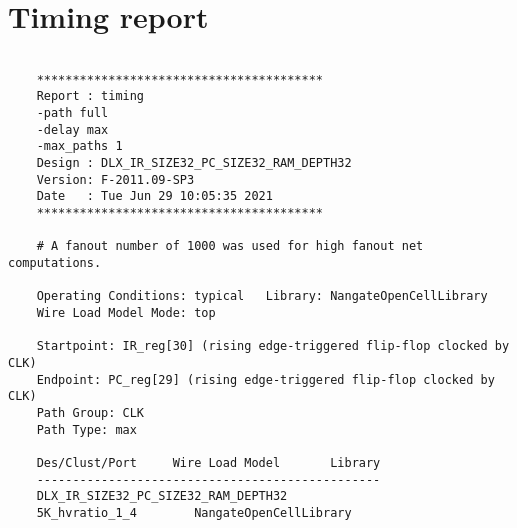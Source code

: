 \section{Timing report}
\begin{lstlisting}
	 
	****************************************
	Report : timing
	-path full
	-delay max
	-max_paths 1
	Design : DLX_IR_SIZE32_PC_SIZE32_RAM_DEPTH32
	Version: F-2011.09-SP3
	Date   : Tue Jun 29 10:05:35 2021
	****************************************
	
	# A fanout number of 1000 was used for high fanout net computations.
	
	Operating Conditions: typical   Library: NangateOpenCellLibrary
	Wire Load Model Mode: top
	
	Startpoint: IR_reg[30] (rising edge-triggered flip-flop clocked by CLK)
	Endpoint: PC_reg[29] (rising edge-triggered flip-flop clocked by CLK)
	Path Group: CLK
	Path Type: max
	
	Des/Clust/Port     Wire Load Model       Library
	------------------------------------------------
	DLX_IR_SIZE32_PC_SIZE32_RAM_DEPTH32
	5K_hvratio_1_4        NangateOpenCellLibrary
	

\end{lstlisting}
